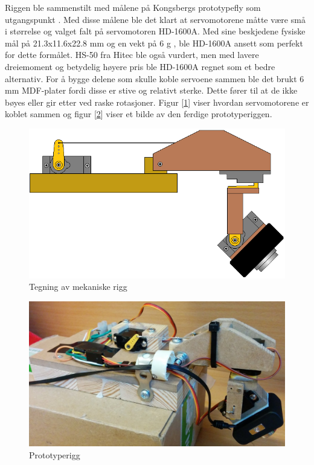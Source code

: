Riggen ble sammenstilt med målene på Kongsbergs prototypefly som utgangspunkt \cite{LocalHawkPDF}. Med disse målene ble det klart at servomotorene måtte være små i størrelse og valget falt på servomotoren HD-1600A. Med sine beskjedene fysiske mål på 21.3x11.6x22.8 mm og en vekt på $6$ g \cite{PowerHD}, ble HD-1600A ansett som perfekt for dette formålet. HS-50 fra Hitec ble også vurdert, men med lavere dreiemoment og betydelig høyere pris ble HD-1600A regnet som et bedre alternativ. For å bygge delene som skulle koble servoene sammen ble det brukt $6$ mm MDF-plater fordi disse er stive og relativt sterke. Dette fører til at de ikke bøyes eller gir etter ved raske rotasjoner. Figur [\ref{fig:RiggTegn}] viser hvordan servomotorene er koblet sammen og figur [\ref{fig:RiggBilde}] viser et bilde av den ferdige prototyperiggen. 

\begin{figure}[h!]
	\centering
	\includegraphics[scale=0.5]{img/RIGG_sattsammen.png}
	\caption{Tegning av mekaniske rigg}
	\label{fig:RiggTegn}
\end{figure}

\begin{figure}[h!]
	\centering
	\includegraphics[scale=0.25]{img/Rigg_Bilde.jpg}
	\caption{Prototyperigg}
	\label{fig:RiggBilde}
\end{figure}

